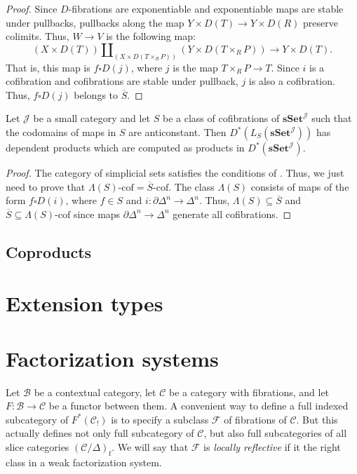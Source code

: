 \documentclass[reqno]{amsart}
\theoremstyle{definition}
\theoremstyle{remark}
\newcommand{\fs}[1]{\mathrm{#1}}
\newcommand{\cat}[1]{\mathbf{#1}}
\newcommand{\scat}[1]{\mathcal{#1}}
\newcommand{\Fib}{\mathcal{F}}
\newcommand{\sSet}{\cat{sSet}}
\newcommand{\class}[2]{#1\text{-}\mathrm{#2}}
\newcommand{\I}{\mathrm{I}}
\newcommand{\Icof}[1][\I]{\class{#1}{cof}}
\numberwithin{figure}{section}
\begin{document}
\begin{proof}
Since $D$-fibrations are exponentiable and exponentiable maps are stable under pullbacks, pullbacks along the map $Y \times D(T) \to Y \times D(R)$ preserve colimits.
Thus, $W \to V$ is the following map:
\[ (X \times D(T)) \amalg_{(X \times D(T \times_R P))} (Y \times D(T \times_R P)) \to Y \times D(T). \]
That is, this map is $f \square D(j)$, where $j$ is the map $T \times_R P \to T$.
Since $i$ is a cofibration and cofibrations are stable under pullback, $j$ is also a cofibration.
Thus, $f \square D(j)$ belongs to $\overline{S}$.
\end{proof}

\begin{cor}
Let $\scat{J}$ be a small category and let $S$ be a class of cofibrations of $\sSet^\scat{J}$ such that the codomains of maps in $S$ are anticonstant.
Then $D^*(L_S(\sSet^\scat{J}))$ has dependent products which are computed as products in $D^*(\sSet^\scat{J})$.
\end{cor}
\begin{proof}
The category of simplicial sets satisfies the conditions of .
Thus, we just need to prove that $\Icof[\Lambda(S)] = \Icof[\overline{S}]$.
The class $\Lambda(S)$ consists of maps of the form $f \square D(i)$, where $f \in S$ and $i : \partial \Delta^n \to \Delta^n$.
Thus, $\Lambda(S) \subseteq \overline{S}$ and $\overline{S} \subseteq \Icof[\Lambda(S)]$ since maps $\partial \Delta^n \to \Delta^n$ generate all cofibrations.
\end{proof}

\subsection{Coproducts}

\section{Extension types}


\section{Factorization systems}

Let $\scat{B}$ be a contextual category, let $\scat{C}$ be a category with fibrations, and let $F : \scat{B} \to \scat{C}$ be a functor between them.
A convenient way to define a full indexed subcategory of $F^*(\scat{C}_!)$ is to specify a subclass $\Fib$ of fibrations of $\scat{C}$.
But this actually defines not only full subcategory of $\scat{C}$, but also full subcategories of all slice categories $(\scat{C}/\Delta)_\fs{f}$.
We will say that $\Fib$ is \emph{locally reflective} if it the right class in a weak factorization system.
\end{document}
